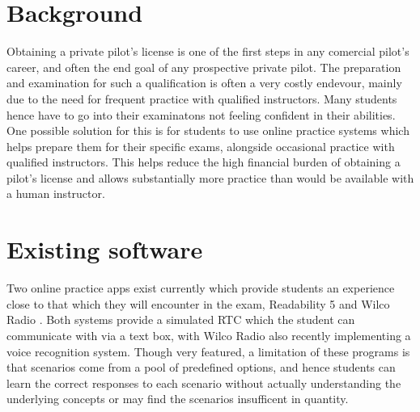 \section{Background}
Obtaining a private pilot's license is one of the first steps in any comercial pilot's career, and often the end goal of any prospective private pilot.
The preparation and examination for such a qualification is often a very costly endevour, mainly due to the need for frequent practice with qualified instructors.
Many students hence have to go into their examinatons not feeling confident in their abilities.
\\
One possible solution for this is for students to use online practice systems which helps prepare them for their specific exams, alongside occasional practice with qualified instructors.
This helps reduce the high financial burden of obtaining a pilot's license and allows substantially more practice than would be available with a human instructor.
\section{Existing software}
Two online practice apps exist currently which provide students an experience close to that which they will encounter in the exam, Readability 5 \cite{readability5} and Wilco Radio \cite{wilcoradio}.
Both systems provide a simulated RTC which the student can communicate with via a text box, with Wilco Radio also recently implementing a voice recognition system.
Though very featured, a limitation of these programs is that scenarios come from a pool of predefined options, and hence students can learn the correct responses to each scenario without actually understanding the underlying concepts or may find the scenarios insufficent in quantity.

